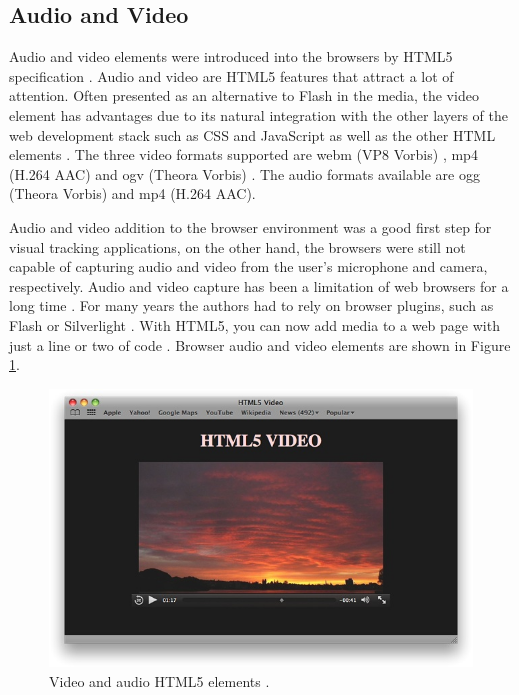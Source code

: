 
\subsection{Audio and Video} %
\label{sub:basic_concepts:web:audio_and_video}

Audio and video elements were introduced into the browsers by HTML5 specification \cite{Hickson2013}. Audio and video are HTML5 features that attract a lot of attention. Often presented as an alternative to Flash \cite{Flash2013} in the media, the video element has advantages due to its natural integration with the other layers of the web development stack such as CSS \cite{CSS2013} and JavaScript as well as the other HTML elements \cite{WC2006}. The three video formats supported are webm (VP8 Vorbis) \cite{Vorbis2012}, mp4 (H.264 AAC) \cite{AAC2006} and ogv (Theora Vorbis) \cite{Theora2011}. The audio formats available are ogg (Theora Vorbis) and mp4 (H.264 AAC).

Audio and video addition to the browser environment was a good first step for visual tracking applications, on the other hand, the browsers were still not capable of capturing audio and video from the user's microphone and camera, respectively. Audio and video capture has been a limitation of web browsers for a long time \cite{Hickson2013}. For many years the authors had to rely on browser plugins, such as Flash \cite{Flash2013} or Silverlight \cite{Silverlight2013,Rocks2013}. With HTML5, you can now add media to a web page with just a line or two of code \cite{WebKit2013}. Browser audio and video elements \cite{Hickson2013} are shown in Figure \ref{figure:html5_audio_video}.

\begin{figure}[!htb]
  \centering
  \includegraphics[width=380pt]{chapters/basic_concepts/html5_audio_video.png}
  \caption{Video and audio HTML5 elements \cite{WebKit2013}.}
  \label{figure:html5_audio_video}
\end{figure}

